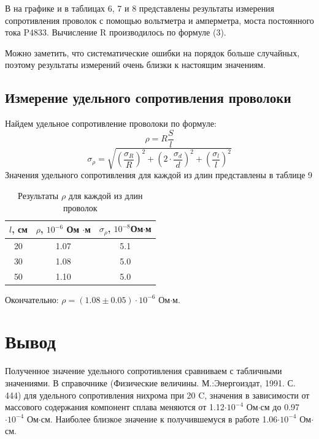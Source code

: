 \documentclass[a4paper,12pt]{article}
\begin{document}
В на графике и в таблицах 6, 7 и 8 представлены результаты измерения сопротивления проволок с помощью вольтметра и амперметра, моста постоянного тока P4833. Вычисление R производилось по формуле (3).

Можно заметить, что систематические ошибки на порядок больше случайных, поэтому  результаты измерений очень близки к настоящим значениям.

\subsection{Измерение удельного сопротивления проволоки}

Найдем удельное сопротивление проволоки по формуле:
\begin{equation}
\rho = R\frac{S}{l}
\end{equation}
\begin{equation}
\sigma_{\rho} = \sqrt{\left( \frac{\sigma_R}{R} \right)^2+\left( 2 \cdot \frac{\sigma_d}{d} \right)^2+\left(\frac{\sigma_l}{l} \right)^2}
\end{equation}
Значения удельного сопротивления для каждой из длин представлены в таблице 9

\begin{table}[H]
\caption{Результаты $\rho$ для каждой из длин проволок}
\begin{tabular}{|c|c|c|}
\hline
$l$, см & $\rho$, $10^{-6}$ Ом $\cdot$м &$\sigma_{\rho}$, $10^{-8}$Ом$\cdot$м \\
\hline
20 & 1.07 & 5.1 \\
\hline
30 & 1.08 & 5.0 \\
\hline
50 & 1.10 & 5.0 \\
\hline
\end{tabular}
\end{table}

Окончательно: $\rho = (1.08 \pm 0.05)\cdot 10^{-6}$ Ом$\cdot$м.

\section{Вывод}
Полученное значение удельного сопротивления сравниваем с табличными значениями. В справочнике (Физические величины. М.:Энергоиздат, 1991. С. 444) для удельного сопротивления нихрома при 20 \textdegree C, значения в зависимости от массового содержания компонент сплава меняются от 1.12$\cdot10^{-4}$ Ом$\cdot$см до 0.97$\cdot10^{-4}$ Ом$\cdot$см. Наиболее близкое значение к получившемуся в работе 1.06$\cdot10^{-4}$ Ом$\cdot$см.
\end{document}
